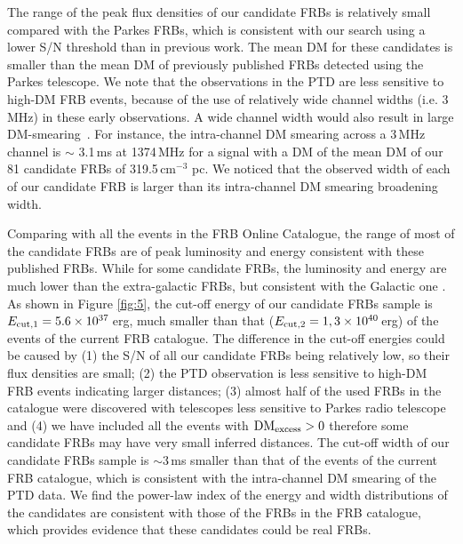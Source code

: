\documentclass[fleqn,usenatbib]{mnras}
\begin{document}
The range of the peak flux densities of our candidate FRBs is relatively small compared with the Parkes FRBs, which is consistent with our search using a lower S/N threshold than in previous work.
The mean DM for these candidates is smaller than the mean DM of previously published FRBs detected using the Parkes telescope. We note that the observations in the PTD are less sensitive to high-DM FRB events, because of the use of relatively wide channel widths (i.e. 3\,MHz) in these early observations. 
%
A wide channel width would also result in large DM-smearing~\citep{dmsmearing}. For instance, the intra-channel DM smearing across a 3\,MHz channel is $\sim$ 3.1\,ms at 1374\,MHz for a signal with a DM of the mean DM of our 81 candidate FRBs of 319.5\,cm$^{-3}$ pc. We noticed that the observed width of each of our candidate FRB is larger than its intra-channel DM smearing broadening width.


Comparing with all the events in the FRB Online Catalogue, the range of most of the candidate FRBs are of peak luminosity and energy consistent with these published FRBs. While for some candidate FRBs, the luminosity and energy are much lower than the extra-galactic FRBs, but consistent with the Galactic one \citep{STARE2}. 
As shown in Figure \ref{fig:5}, the cut-off energy of our candidate FRBs sample is $E_{\rm cut,1}=5.6\times10^{37}$\,erg, much smaller than that ($E_{\rm cut,2}=1,3\times10^{40}$\,erg) of the events of the current FRB catalogue. 
The difference in the cut-off energies could be caused by (1) the S/N of all our candidate FRBs being relatively low, so their flux densities are small; (2) the PTD observation is less sensitive to high-DM FRB events indicating larger distances; (3) almost half of the used FRBs in the catalogue were discovered with telescopes less sensitive to Parkes radio telescope and (4) we have included all the events with ${\rm DM}_{\rm excess}>0$ therefore some candidate FRBs may have very small inferred distances.
%
The cut-off width of our candidate FRBs sample is $\sim 3\,$ms smaller than that of the events of the current FRB catalogue, which is consistent with the intra-channel DM smearing of the PTD data. 
We find the power-law index of the energy and width distributions of the candidates are consistent with those of the FRBs in the FRB catalogue, which provides evidence that these candidates could be real FRBs.
\end{document}
